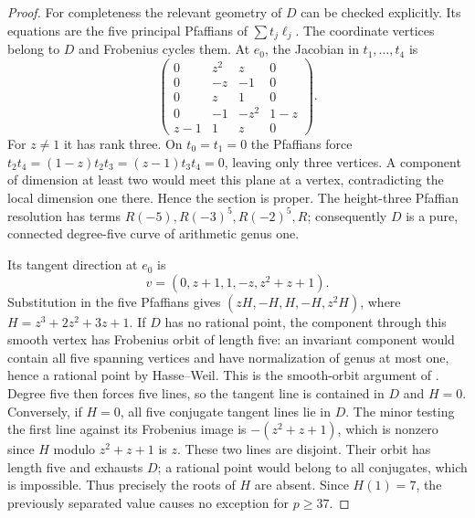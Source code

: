 \begin{proof}
For completeness the relevant geometry of $D$ can be checked explicitly. Its equations are the five principal Pfaffians of $\sum t_j\ell_j$. The coordinate vertices belong to $D$ and Frobenius cycles them. At $e_0$, the Jacobian in $t_1,\ldots,t_4$ is
\[
 \begin{pmatrix}
 0&z^2&z&0\\0&-z&-1&0\\0&z&1&0\\
 0&-1&-z^2&1-z\\z-1&1&z&0
 \end{pmatrix}.
\]
For $z\ne1$ it has rank three. On $t_0=t_1=0$ the Pfaffians force
$t_2t_4=(1-z)t_2t_3=(z-1)t_3t_4=0$, leaving only three vertices. A component of dimension at least two would meet this plane at a vertex, contradicting the local dimension one there. Hence the section is proper. The height-three Pfaffian resolution has terms
$R(-5),R(-3)^5,R(-2)^5,R$; consequently $D$ is a pure, connected degree-five curve of arithmetic genus one.

Its tangent direction at $e_0$ is
\[
 v=(0,z+1,1,-z,z^2+z+1).
\]
Substitution in the five Pfaffians gives
$(zH,-H,H,-H,z^2H)$, where $H=z^3+2z^2+3z+1$.
If $D$ has no rational point, the component through this smooth vertex has Frobenius orbit of length five: an invariant component would contain all five spanning vertices and have normalization of genus at most one, hence a rational point by Hasse--Weil. This is the smooth-orbit argument of \cite[Lemma~3.1]{lu2026-scattered}. Degree five then forces five lines, so the tangent line is contained in $D$ and $H=0$.
Conversely, if $H=0$, all five conjugate tangent lines lie in $D$. The minor testing the first line against its Frobenius image is $-(z^2+z+1)$, which is nonzero since $H$ modulo $z^2+z+1$ is $z$. These two lines are disjoint. Their orbit has length five and exhausts $D$; a rational point would belong to all conjugates, which is impossible. Thus precisely the roots of $H$ are absent. Since $H(1)=7$, the previously separated value causes no exception for $p\ge37$.
\end{proof}

